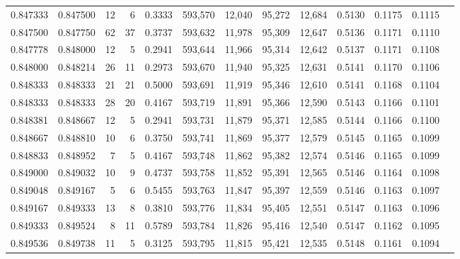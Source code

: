 \begin{tabular}{rrrrrrrrrrrrr}
0.847333 & 0.847500 &    12 &   6 &                                     0.3333 & 593,570 &  12,040 &  95,272 &  12,684 & 0.5130 & 0.1175 & 0.1115 \\
0.847500 & 0.847750 &    62 &  37 &                                     0.3737 & 593,632 &  11,978 &  95,309 &  12,647 & 0.5136 & 0.1171 & 0.1110 \\
0.847778 & 0.848000 &    12 &   5 &                                     0.2941 & 593,644 &  11,966 &  95,314 &  12,642 & 0.5137 & 0.1171 & 0.1108 \\
0.848000 & 0.848214 &    26 &  11 &                                     0.2973 & 593,670 &  11,940 &  95,325 &  12,631 & 0.5141 & 0.1170 & 0.1106 \\
0.848333 & 0.848333 &    21 &  21 &                                     0.5000 & 593,691 &  11,919 &  95,346 &  12,610 & 0.5141 & 0.1168 & 0.1104 \\
0.848333 & 0.848333 &    28 &  20 &                                     0.4167 & 593,719 &  11,891 &  95,366 &  12,590 & 0.5143 & 0.1166 & 0.1101 \\
0.848381 & 0.848667 &    12 &   5 &                                     0.2941 & 593,731 &  11,879 &  95,371 &  12,585 & 0.5144 & 0.1166 & 0.1100 \\
0.848667 & 0.848810 &    10 &   6 &                                     0.3750 & 593,741 &  11,869 &  95,377 &  12,579 & 0.5145 & 0.1165 & 0.1099 \\
0.848833 & 0.848952 &     7 &   5 &                                     0.4167 & 593,748 &  11,862 &  95,382 &  12,574 & 0.5146 & 0.1165 & 0.1099 \\
0.849000 & 0.849032 &    10 &   9 &                                     0.4737 & 593,758 &  11,852 &  95,391 &  12,565 & 0.5146 & 0.1164 & 0.1098 \\
0.849048 & 0.849167 &     5 &   6 &                                     0.5455 & 593,763 &  11,847 &  95,397 &  12,559 & 0.5146 & 0.1163 & 0.1097 \\
0.849167 & 0.849333 &    13 &   8 &                                     0.3810 & 593,776 &  11,834 &  95,405 &  12,551 & 0.5147 & 0.1163 & 0.1096 \\
0.849333 & 0.849524 &     8 &  11 &                                     0.5789 & 593,784 &  11,826 &  95,416 &  12,540 & 0.5147 & 0.1162 & 0.1095 \\
0.849536 & 0.849738 &    11 &   5 &                                     0.3125 & 593,795 &  11,815 &  95,421 &  12,535 & 0.5148 & 0.1161 & 0.1094 \\

\end{tabular}
